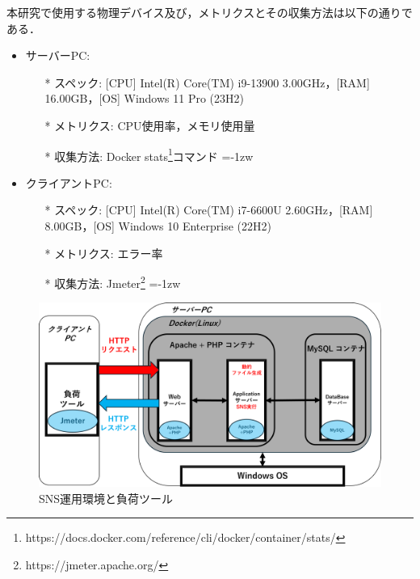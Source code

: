\documentclass[twoside,twocolumn,10pt]{jarticle}  %
\begin{document}
本研究で使用する物理デバイス及び，メトリクスとその収集方法は以下の通りである．
\begin{itemize}
  \setlength{\parskip}{0cm} %
  \setlength{\itemsep}{0cm} %
  \item サーバーPC:
  \vspace{-0.05cm}
  \begin{itemize}
  \leftskip=-1zw%
  \item[*] スペック: [CPU] Intel(R) Core(TM) i9-13900 3.00GHz，[RAM] 16.00GB，[OS] Windows 11 Pro (23H2)\par
  \vspace{-0.05cm}
  \item[*] メトリクス: CPU使用率，メモリ使用量\par
  \vspace{-0.05cm}
  \item[*] 収集方法: Docker stats\footnote{https://docs.docker.com/reference/cli/docker/container/stats/}コマンド
  \leftskip=-1zw%
  \end{itemize}
  \item クライアントPC:
  \vspace{-0.05cm}
  \begin{itemize}
  \leftskip=-1zw%
  \item[*] スペック: [CPU] Intel(R) Core(TM) i7-6600U 2.60GHz，[RAM] 8.00GB，[OS] Windows 10 Enterprise (22H2)\par
  \vspace{-0.05cm}
  \item[*] メトリクス: エラー率\par
  \vspace{-0.05cm}
  \item[*] 収集方法: Jmeter\footnote{https://jmeter.apache.org/}
  \leftskip=-1zw%
  \end{itemize}
\end{itemize}

\begin{figure}[t]
  \centering
  \includegraphics[scale=0.239]{figures/SNS_Docker.png}
  \vspace{-0.55cm}
  \caption{SNS運用環境と負荷ツール}
  \label{fig:1}
  \vspace{-0.15cm}
\end{figure}
\end{document}
